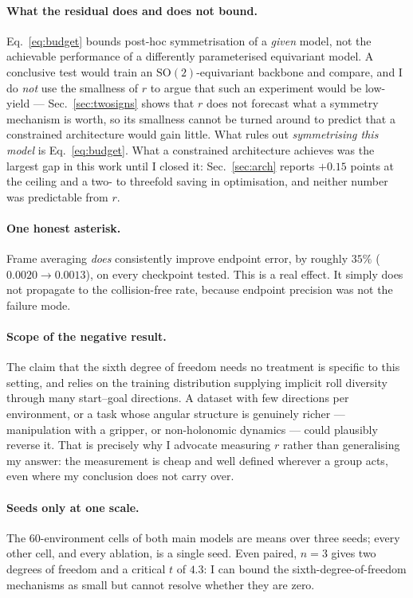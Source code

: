 \documentclass[11pt,a4paper]{article}
\newcommand{\SO}{\mathrm{SO}}
\begin{document}
\paragraph{What the residual does and does not bound.} Eq.~\eqref{eq:budget}
bounds post-hoc symmetrisation of a \emph{given} model, not the achievable
performance of a differently parameterised equivariant model. A conclusive test
would train an $\SO(2)$-equivariant backbone and compare, and I do \emph{not} use
the smallness of $r$ to argue that such an experiment would be low-yield ---
Sec.~\ref{sec:twosigns} shows that $r$ does not forecast what a symmetry
mechanism is worth, so its smallness cannot be turned around to predict that a
constrained architecture would gain little. What rules out \emph{symmetrising
this model} is Eq.~\eqref{eq:budget}. What a constrained architecture achieves
was the largest gap in this work until I closed it: Sec.~\ref{sec:arch} reports
$+0.15$ points at the ceiling and a two- to threefold saving in optimisation, and
neither number was predictable from $r$.

\paragraph{One honest asterisk.} Frame averaging \emph{does} consistently improve
endpoint error, by roughly $35\%$ ($0.0020 \to 0.0013$), on every checkpoint
tested. This is a real effect. It simply does not propagate to the collision-free
rate, because endpoint precision was not the failure mode.

\paragraph{Scope of the negative result.} The claim that the sixth degree of
freedom needs no treatment is specific to this setting, and relies on the
training distribution supplying implicit roll diversity through many start--goal
directions. A dataset with few directions per environment, or a task whose
angular structure is genuinely richer --- manipulation with a gripper, or
non-holonomic dynamics --- could plausibly reverse it. That is precisely why I
advocate measuring $r$ rather than generalising my answer: the measurement is
cheap and well defined wherever a group acts, even where my conclusion does not
carry over.

\paragraph{Seeds only at one scale.} The $60$-environment cells of both main models
are means over three seeds; every other cell, and every ablation, is a single
seed. Even paired, $n=3$ gives two degrees of freedom and a critical $t$ of
$4.3$: I can bound the sixth-degree-of-freedom mechanisms as small but cannot
resolve whether they are zero.
\end{document}
